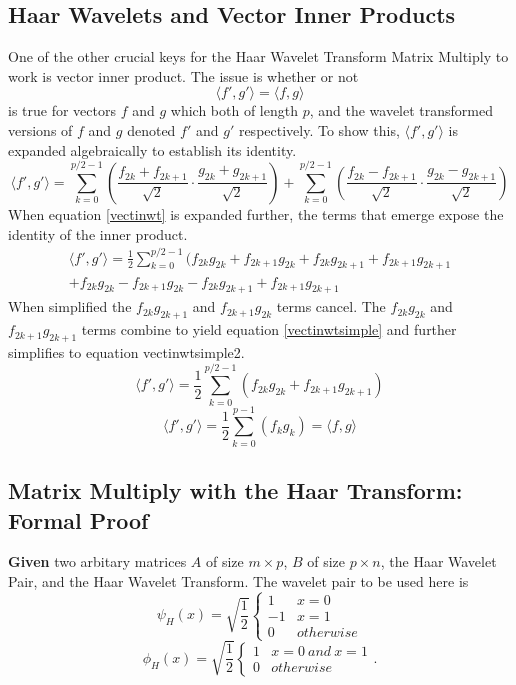 \subsection {Haar Wavelets and Vector Inner Products}
One of the other crucial keys for the Haar Wavelet Transform Matrix Multiply to work is vector inner product.  The issue is whether or not 
\begin{equation}
\langle f', g' \rangle = \langle f,g \rangle 
\end{equation}
is true for vectors $f$ and $g$ which both of length $p$, and the wavelet transformed versions of $f$ and $g$ denoted $f'$ and $g'$ respectively.
To show this, $\langle f',g' \rangle$ is expanded algebraically to establish its identity.  
\begin{equation}
\label {vectinwt}
\langle f',g' \rangle = \sum \limits_{k=0} ^{p/2 -1}(\frac{f_{2k} +f_{2k+1}}{\sqrt{2}} \cdot \frac{g_{2k} + g_{2k+1}}{\sqrt{2}}) + \sum \limits_{k=0} ^{p/2 -1}(\frac{f_{2k} - f_{2k+1}}{\sqrt{2}} \cdot \frac{g_{2k} - g_{2k+1}}{\sqrt{2}})
\end{equation}
When equation \ref{vectinwt} is expanded further, the terms that emerge expose the identity of the inner product.  
\begin{eqnarray}
\label {vectinwte}
\langle f',g' \rangle = \frac{1}{2}  \sum \limits_{k=0} ^{p/2 -1}
( f_{2k} g_{2k} + f_{2k+1}g_{2k} + f_{2k}g_{2k+1} + f_{2k+1}g_{2k+1}  \\ \nonumber+  f_{2k} g_{2k} - f_{2k+1}g_{2k} - f_{2k}g_{2k+1} + f_{2k+1}g_{2k+1} 
\end{eqnarray}
When simplified the $f_{2k}g_{2k+1}$ and $f_{2k+1}g_{2k}$ terms cancel.  The $f_{2k}g_{2k}$ and $f_{2k+1}g_{2k+1}$ terms combine to yield equation \ref{vectinwtsimple} and further simplifies to equation {vectinwtsimple2}.
\begin{equation}
\label {vectinwtsimple}
\langle f',g' \rangle = \frac{1}{2}  \sum \limits_{k=0} ^{p/2 -1} (f_{2k}g_{2k} + f_{2k+1}g_{2k+1})
\end{equation}
\begin{equation}
\label {vectinwtsimple2}
\langle f',g' \rangle = \frac{1}{2}  \sum \limits_{k=0} ^{p-1} (f_{k}g_{k} ) = \langle f,g \rangle
\end{equation}


\subsection{Matrix Multiply with the Haar Transform: Formal Proof}
\textbf{Given} two arbitary matrices $A$ of size $m\times p$, $B$ of size $p\times n$, the Haar Wavelet Pair, and the Haar Wavelet Transform.  The wavelet pair to be used here is 
\[ \psi_H (x)= \sqrt{\frac{1}{2}} \left\{\begin{array}{cc}1 & x=0 \\-1 & x=1 \\0 & otherwise\end{array}\right.\]
\[\phi_H (x) = \sqrt{\frac{1}{2}} \left\{\begin{array}{cc}1 & x=0\  {and}\ x=1 \\0 & otherwise\end{array}\right 
.. \]
%

